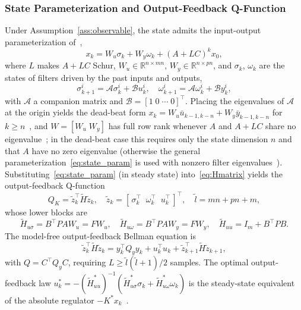 \documentclass[12pt]{elsarticle}
\theoremstyle{remark}
\newcommand{\R}{\mathbb{R}}
\begin{document}
\subsubsection{State Parameterization and Output-Feedback Q-Function}
\label{subsec:param}
Under Assumption~\ref{ass:observable}, the state admits the input-output parameterization of~\cite[Thm.~2.1]{rizvi2022},
\begin{equation}
x_k = W_u \sigma_k + W_y \omega_k + (A + LC)^k x_0,
\label{eq:state_param}
\end{equation}
where $L$ makes $A + LC$ Schur, $W_u \in \R^{n \times mn}$, $W_y \in \R^{n \times pn}$, and $\sigma_k$, $\omega_k$ are the states of filters driven by the past inputs and outputs,
\begin{equation}
\sigma_{k+1}^i = \mathcal{A}\sigma_k^i + \mathcal{B}u_k^i, \quad \omega_{k+1}^i = \mathcal{A}\omega_k^i + \mathcal{B}y_k^i,
\label{eq:filters}
\end{equation}
with $\mathcal{A}$ a companion matrix and $\mathcal{B} = [1 \; 0 \; \cdots \; 0]^\top$. Placing the eigenvalues of $\mathcal{A}$ at the origin yields the dead-beat form $x_k = W_u \bar{u}_{k-1,k-n} + W_y \bar{y}_{k-1,k-n}$ for $k \geq n$~\cite[Thm.~2.2]{rizvi2022}, and $W = [W_u \; W_y]$ has full row rank whenever $A$ and $A + LC$ share no eigenvalue~\cite[Thm.~2.4]{rizvi2022}; in the dead-beat case this requires only the state dimension $n$ and that $A$ have no zero eigenvalue (otherwise the general parameterization~\eqref{eq:state_param} is used with nonzero filter eigenvalues~\cite[Rem.~2.2]{rizvi2022}).
Substituting~\eqref{eq:state_param} (in steady state) into~\eqref{eq:Hmatrix} yields the output-feedback Q-function~\cite[Eqs.~(2.19)--(2.20)]{rizvi2022}
\begin{equation}
Q_K = \tilde{z}_k^\top \tilde{H} \tilde{z}_k, \quad \tilde{z}_k = [\,\sigma_k^\top \;\; \omega_k^\top \;\; u_k^\top\,]^\top,
\quad \tilde{l} = mn + pn + m,
\label{eq:ofb_qfunc}
\end{equation}
whose lower blocks are
\begin{equation}
\tilde{H}_{u\sigma} = B^\top P A W_u = F W_u, \quad
\tilde{H}_{u\omega} = B^\top P A W_y = F W_y, \quad
\tilde{H}_{uu} = I_m + B^\top P B.
\label{eq:ofb_blocks}
\end{equation}
The model-free output-feedback Bellman equation is~\cite[Eq.~(2.27)]{rizvi2022}
\begin{equation}
\tilde{z}_k^\top \tilde{H} \tilde{z}_k = y_k^\top Q_y y_k + u_k^\top u_k + \tilde{z}_{k+1}^\top \tilde{H} \tilde{z}_{k+1},
\label{eq:ofb_bellman}
\end{equation}
with $Q = C^\top Q_y C$, requiring $L \geq \tilde{l}(\tilde{l}+1)/2$ samples. The optimal output-feedback law $u_k^* = -(\tilde{H}_{uu}^*)^{-1}(\tilde{H}_{u\sigma}^* \sigma_k + \tilde{H}_{u\omega}^* \omega_k)$ is the steady-state equivalent of the absolute regulator $-K^* x_k$~\cite[Thm.~2.5]{rizvi2022}.
\end{document}
